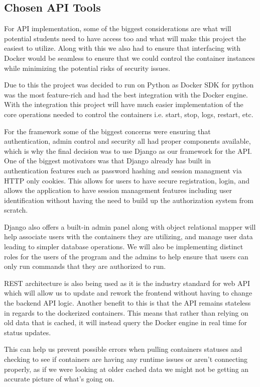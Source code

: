 \documentclass[12pt,titlepage]{article}
\begin{document}
\subsection{Chosen API Tools}
For API implementation, some of the biggest considerations are what will potential students need to have access too and what will make this project the easiest to utilize. Along with this we also had to ensure that interfacing with Docker would be seamless to ensure that we could control the container instances while minimizing the potential risks of security issues.

Due to this the project was decided to run on Python as Docker SDK for python was the most feature-rich and had the best integration with the Docker engine.  With the integration this project will have much easier implementation of the core operations needed to control the containers i.e. start, stop, logs, restart, etc. 

For the framework some of the biggest concerns were ensuring that authentication, admin control and security all had proper components available, which is why the final decision was to use Django as our framework for the API. One of the biggest motivators was that Django already has built in authentication features such as password hashing and session managment via HTTP only cookies. This allows for users to have secure registration, login, and allows the application to have session management features including user identification without having the need to build up the authorization system from scratch.

Django also offers a built-in admin panel along with object relational mapper will help associate users with the containers they are utilizing, and manage user data leading to simpler database operations. We will also be implementing distinct roles for the users of the program and the admins to help ensure that users can only run commands that they are authorized to run. 

REST architecture is also being used as it is the industry standard for web API which will allow us to update and rework the frontend without having to change the backend API logic. Another benefit to this is that the API remains stateless in regards to the dockerized containers. This means that rather than relying on old data that is cached, it will instead query the Docker engine in real time for status updates.

This can help us prevent possible errors when pulling containers statuses and checking to see if containers are having any runtime issues or aren't connecting properly, as if we were looking at older cached data we might not be getting an accurate picture of what's going on.
\end{document}
